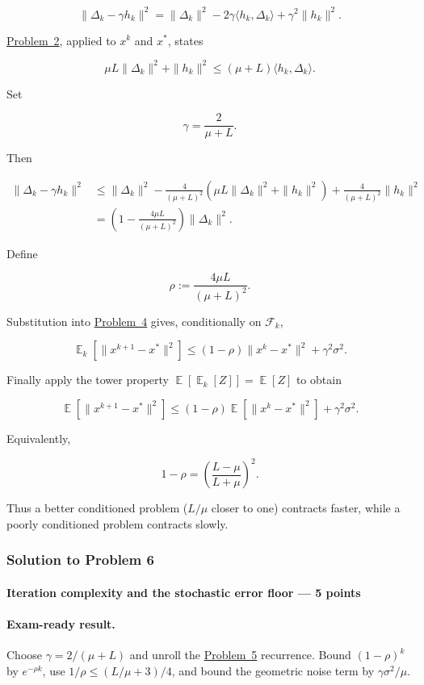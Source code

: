 \documentclass[11pt,a4paper]{article}
\DeclareMathOperator{\E}{\mathbb{E}}
\newcommand{\jump}[2]{\hyperref[#1]{#2}}
\theoremstyle{definition}
\begin{document}
\[
\|\Delta_k-\gamma h_k\|^2
=\|\Delta_k\|^2-2\gamma\langle h_k,\Delta_k\rangle+\gamma^2\|h_k\|^2.
\]

\jump{prob:spr2025-opt-2}{Problem~2}, applied to $x^k$ and $x^*$, states

\[
\mu L\|\Delta_k\|^2+\|h_k\|^2
\leq(\mu+L)\langle h_k,\Delta_k\rangle.
\]

Set

\[
\gamma=\frac{2}{\mu+L}.
\]

Then

\begin{align*}
\|\Delta_k-\gamma h_k\|^2
&\leq \|\Delta_k\|^2
-\frac{4}{(\mu+L)^2}
\left(\mu L\|\Delta_k\|^2+\|h_k\|^2\right)
+\frac{4}{(\mu+L)^2}\|h_k\|^2\\
&=\left(1-\frac{4\mu L}{(\mu+L)^2}\right)\|\Delta_k\|^2.
\end{align*}

Define

\[
\rho:=\frac{4\mu L}{(\mu+L)^2}.
\]

Substitution into \jump{prob:spr2025-opt-4}{Problem~4} gives, conditionally on $\mathcal{F}_k$,

\[
\E_k\left[\|x^{k+1}-x^*\|^2\right]
\leq(1-\rho)\|x^k-x^*\|^2+\gamma^2\sigma^2.
\]

Finally apply the tower property $\E[\E_k[Z]]=\E[Z]$ to obtain

\[
\E\left[\|x^{k+1}-x^*\|^2\right]
\leq(1-\rho)\E\left[\|x^k-x^*\|^2\right]+\gamma^2\sigma^2.
\]

Equivalently,

\[
1-\rho=\left(\frac{L-\mu}{L+\mu}\right)^2.
\]

Thus a better conditioned problem ($L/\mu$ closer to one) contracts faster, while a poorly conditioned problem contracts slowly.

\subsubsection{Solution to Problem 6}\label{sol:spr2025-opt-6}

\paragraph{Iteration complexity and the stochastic error floor --- 5 points}

\paragraph{Exam-ready result.}
Choose $\gamma=2/(\mu+L)$ and unroll the \jump{prob:spr2025-opt-5}{Problem~5} recurrence. Bound $(1-\rho)^k$ by $e^{-\rho k}$, use $1/\rho\leq(L/\mu+3)/4$, and bound the geometric noise term by $\gamma\sigma^2/\mu$.
\end{document}
